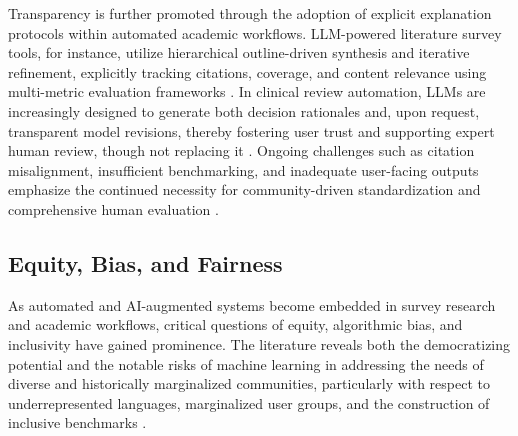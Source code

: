 \documentclass[sigconf]{acmart}
\begin{document}
Transparency is further promoted through the adoption of explicit explanation protocols within automated academic workflows. LLM-powered literature survey tools, for instance, utilize hierarchical outline-driven synthesis and iterative refinement, explicitly tracking citations, coverage, and content relevance using multi-metric evaluation frameworks \cite{ref62,ref80,ref82,ref102}. In clinical review automation, LLMs are increasingly designed to generate both decision rationales and, upon request, transparent model revisions, thereby fostering user trust and supporting expert human review, though not replacing it \cite{ref80,ref102,ref103}. Ongoing challenges such as citation misalignment, insufficient benchmarking, and inadequate user-facing outputs emphasize the continued necessity for community-driven standardization and comprehensive human evaluation \cite{ref39,ref62,ref64,ref80,ref83,ref106}.

\subsection{Equity, Bias, and Fairness}

As automated and AI-augmented systems become embedded in survey research and academic workflows, critical questions of equity, algorithmic bias, and inclusivity have gained prominence. The literature reveals both the democratizing potential and the notable risks of machine learning in addressing the needs of diverse and historically marginalized communities, particularly with respect to underrepresented languages, marginalized user groups, and the construction of inclusive benchmarks \cite{ref2}\cite{ref4}\cite{ref7}\cite{ref9}\cite{ref10}\cite{ref13}\cite{ref14}\cite{ref15}\cite{ref23}\cite{ref24}\cite{ref39}\cite{ref40}\cite{ref41}\cite{ref45}\cite{ref51}\cite{ref53}\cite{ref64}\cite{ref65}\cite{ref66}\cite{ref70}\cite{ref76}\cite{ref80}\cite{ref81}\cite{ref82}\cite{ref83}\cite{ref84}\cite{ref85}\cite{ref89}\cite{ref90}\cite{ref91}\cite{ref92}\cite{ref93}\cite{ref94}\cite{ref95}\cite{ref96}\cite{ref97}\cite{ref98}\cite{ref99}\cite{ref100}\cite{ref105}\cite{ref106}.
\end{document}
